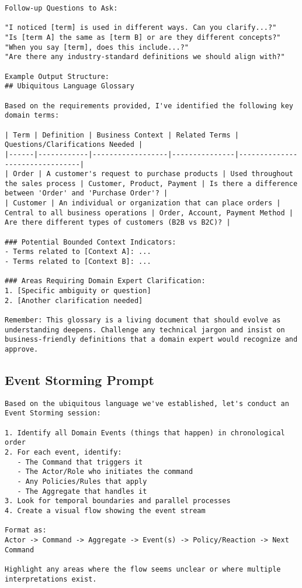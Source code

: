 \begin{Verbatim}[breaklines=true]
Follow-up Questions to Ask:

"I noticed [term] is used in different ways. Can you clarify...?"
"Is [term A] the same as [term B] or are they different concepts?"
"When you say [term], does this include...?"
"Are there any industry-standard definitions we should align with?"

Example Output Structure:
## Ubiquitous Language Glossary

Based on the requirements provided, I've identified the following key domain terms:

| Term | Definition | Business Context | Related Terms | Questions/Clarifications Needed |
|------|------------|------------------|---------------|--------------------------------|
| Order | A customer's request to purchase products | Used throughout the sales process | Customer, Product, Payment | Is there a difference between 'Order' and 'Purchase Order'? |
| Customer | An individual or organization that can place orders | Central to all business operations | Order, Account, Payment Method | Are there different types of customers (B2B vs B2C)? |

### Potential Bounded Context Indicators:
- Terms related to [Context A]: ...
- Terms related to [Context B]: ...

### Areas Requiring Domain Expert Clarification:
1. [Specific ambiguity or question]
2. [Another clarification needed]

Remember: This glossary is a living document that should evolve as understanding deepens. Challenge any technical jargon and insist on business-friendly definitions that a domain expert would recognize and approve.
\end{Verbatim}

\subsection{Event Storming Prompt}\label{app:event-storming-prompt}
\begin{Verbatim}[breaklines=true]
Based on the ubiquitous language we've established, let's conduct an Event Storming session:

1. Identify all Domain Events (things that happen) in chronological order
2. For each event, identify:
   - The Command that triggers it
   - The Actor/Role who initiates the command
   - Any Policies/Rules that apply
   - The Aggregate that handles it
3. Look for temporal boundaries and parallel processes
4. Create a visual flow showing the event stream

Format as:
Actor -> Command -> Aggregate -> Event(s) -> Policy/Reaction -> Next Command

Highlight any areas where the flow seems unclear or where multiple interpretations exist.
\end{Verbatim}

